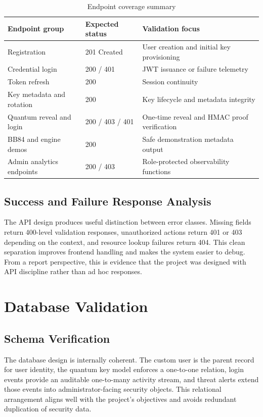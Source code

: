 \begin{table}[H]
\centering
\small
\caption{Endpoint coverage summary}
\label{tab:endpoint-coverage}
\begin{tabular}{|p{4.0cm}|p{3.2cm}|p{5.8cm}|}
\hline
\textbf{Endpoint group} & \textbf{Expected status} & \textbf{Validation focus} \\
\hline
Registration & 201 Created & User creation and initial key provisioning \\
\hline
Credential login & 200 / 401 & JWT issuance or failure telemetry \\
\hline
Token refresh & 200 & Session continuity \\
\hline
Key metadata and rotation & 200 & Key lifecycle and metadata integrity \\
\hline
Quantum reveal and login & 200 / 403 / 401 & One-time reveal and HMAC proof verification \\
\hline
BB84 and engine demos & 200 & Safe demonstration metadata output \\
\hline
Admin analytics endpoints & 200 / 403 & Role-protected observability functions \\
\hline
\end{tabular}
\end{table}

\subsection{Success and Failure Response Analysis}
The API design produces useful distinction between error classes. Missing fields return 400-level validation responses, unauthorized actions return 401 or 403 depending on the context, and resource lookup failures return 404. This clean separation improves frontend handling and makes the system easier to debug. From a report perspective, this is evidence that the project was designed with API discipline rather than ad hoc responses.

\section{Database Validation}

\subsection{Schema Verification}
The database design is internally coherent. The custom user is the parent record for user identity, the quantum key model enforces a one-to-one relation, login events provide an auditable one-to-many activity stream, and threat alerts extend those events into administrator-facing security objects. This relational arrangement aligns well with the project's objectives and avoids redundant duplication of security data.

